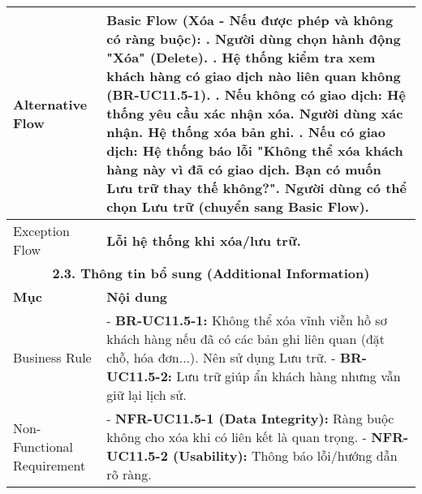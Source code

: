 \begin{longtable}{|m{4cm}|p{11cm}|}
\hline
Alternative Flow & \textbf{Basic Flow (Xóa - Nếu được phép và không có ràng buộc):} \newline    1. Người dùng chọn hành động "Xóa" (Delete). \newline    2. Hệ thống kiểm tra xem khách hàng có giao dịch nào liên quan không (BR-UC11.5-1). \newline    3. \textbf{Nếu không có giao dịch:} Hệ thống yêu cầu xác nhận xóa. Người dùng xác nhận. Hệ thống xóa bản ghi. \newline    4. \textbf{Nếu có giao dịch:} Hệ thống báo lỗi "Không thể xóa khách hàng này vì đã có giao dịch. Bạn có muốn Lưu trữ thay thế không?". Người dùng có thể chọn Lưu trữ (chuyển sang Basic Flow). \\
\hline
Exception Flow & \textbf{Lỗi hệ thống khi xóa/lưu trữ.} \\
\hline
\multicolumn{2}{|c|}{\textbf{2.3. Thông tin bổ sung (Additional Information)}} \\
\hline
\textbf{Mục} & \textbf{Nội dung} \\
\hline
Business Rule & - \textbf{BR-UC11.5-1:} Không thể xóa vĩnh viễn hồ sơ khách hàng nếu đã có các bản ghi liên quan (đặt chỗ, hóa đơn...). Nên sử dụng Lưu trữ. \newline - \textbf{BR-UC11.5-2:} Lưu trữ giúp ẩn khách hàng nhưng vẫn giữ lại lịch sử. \\
\hline
Non-Functional Requirement & - \textbf{NFR-UC11.5-1 (Data Integrity):} Ràng buộc không cho xóa khi có liên kết là quan trọng. \newline - \textbf{NFR-UC11.5-2 (Usability):} Thông báo lỗi/hướng dẫn rõ ràng. \\
\hline
\end{longtable}

